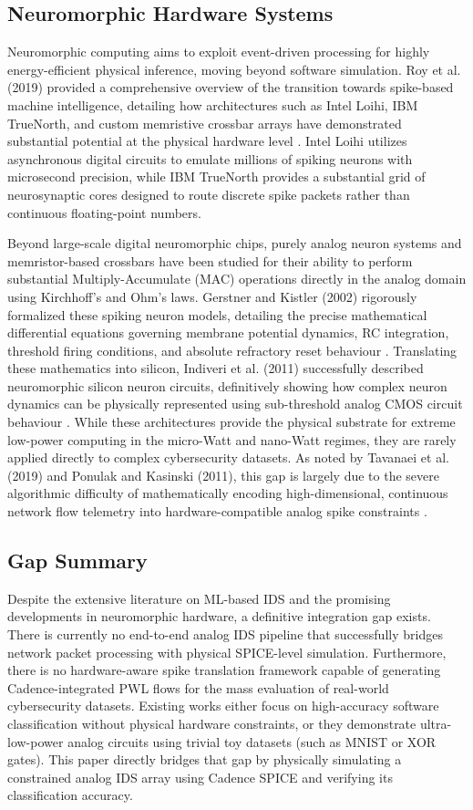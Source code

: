 \documentclass{ieeeaccess}
\begin{document}
\subsection{Neuromorphic Hardware Systems}
Neuromorphic computing aims to exploit event-driven processing for highly energy-efficient physical inference, moving beyond software simulation. Roy et al. (2019) provided a comprehensive overview of the transition towards spike-based machine intelligence, detailing how architectures such as Intel Loihi, IBM TrueNorth, and custom memristive crossbar arrays have demonstrated substantial potential at the physical hardware level \cite{Roy2019}. Intel Loihi utilizes asynchronous digital circuits to emulate millions of spiking neurons with microsecond precision, while IBM TrueNorth provides a substantial grid of neurosynaptic cores designed to route discrete spike packets rather than continuous floating-point numbers.

Beyond large-scale digital neuromorphic chips, purely analog neuron systems and memristor-based crossbars have been studied for their ability to perform substantial Multiply-Accumulate (MAC) operations directly in the analog domain using Kirchhoff's and Ohm's laws. Gerstner and Kistler (2002) rigorously formalized these spiking neuron models, detailing the precise mathematical differential equations governing membrane potential dynamics, RC integration, threshold firing conditions, and absolute refractory reset behaviour \cite{Gerstner2002}. Translating these mathematics into silicon, Indiveri et al. (2011) successfully described neuromorphic silicon neuron circuits, definitively showing how complex neuron dynamics can be physically represented using sub-threshold analog CMOS circuit behaviour \cite{Indiveri2011}. While these architectures provide the physical substrate for extreme low-power computing in the micro-Watt and nano-Watt regimes, they are rarely applied directly to complex cybersecurity datasets. As noted by Tavanaei et al. (2019) and Ponulak and Kasinski (2011), this gap is largely due to the severe algorithmic difficulty of mathematically encoding high-dimensional, continuous network flow telemetry into hardware-compatible analog spike constraints \cite{Tavanaei2019, Ponulak2011}.

\subsection{Gap Summary}
Despite the extensive literature on ML-based IDS and the promising developments in neuromorphic hardware, a definitive integration gap exists. There is currently no end-to-end analog IDS pipeline that successfully bridges network packet processing with physical SPICE-level simulation. Furthermore, there is no hardware-aware spike translation framework capable of generating Cadence-integrated PWL flows for the mass evaluation of real-world cybersecurity datasets. Existing works either focus on high-accuracy software classification without physical hardware constraints, or they demonstrate ultra-low-power analog circuits using trivial toy datasets (such as MNIST or XOR gates). This paper directly bridges that gap by physically simulating a constrained analog IDS array using Cadence SPICE and verifying its classification accuracy.
\end{document}
